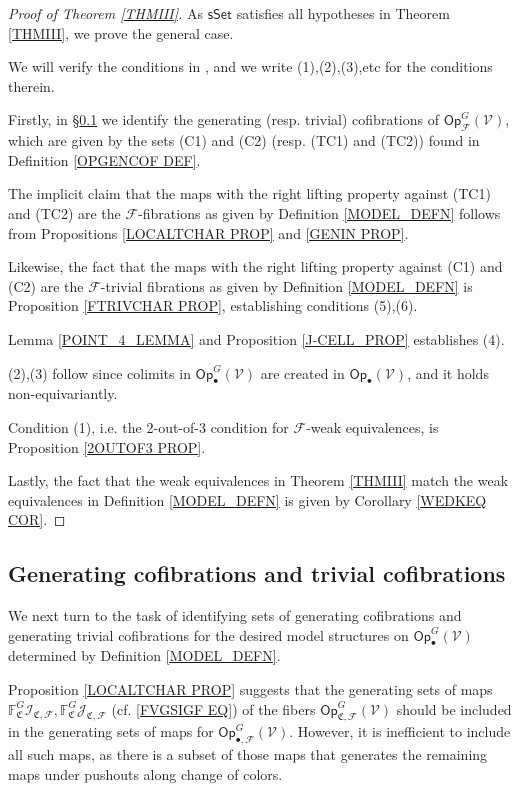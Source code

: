 \documentclass[a4paper,10pt
,draft
]{article}%
\numberwithin{equation}{section}
\numberwithin{figure}{section}
\theoremstyle{definition} %
\newcommand{\sSet}{\ensuremath{\mathsf{sSet}}}%
\newcommand{\Op}{\mathsf{Op}}%
\newcommand{\F}{\ensuremath{\mathcal F}}
\newcommand{\V}{\ensuremath{\mathcal V}}
\newcommand{\1}{\ensuremath{\mathbbm 1}}%
\begin{document}
\begin{proof}[Proof of Theorem \ref{THMIII}]
      As $\sSet$ satisfies all 
      hypotheses in Theorem \ref{THMIII}, we prove the general case.

      We will verify the conditions in 
\cite[Theorem 2.1.19]{Hov99}, and we write (1),(2),(3),etc for the conditions therein.

Firstly, in \S \ref{GENCOF SEC} we identify
the generating (resp. trivial) cofibrations of $\mathsf{Op}^G_{\F}(\V)$,
which are given by the sets 
(C1) and (C2) (resp. (TC1) and (TC2))
found in Definition \ref{OPGENCOF DEF}.

The implicit claim that the maps
with the right lifting property against 
(TC1) and (TC2)
are the $\F$-fibrations as given by 
Definition \ref{MODEL_DEFN}
follows from Propositions \ref{LOCALTCHAR PROP} and \ref{GENIN PROP}.

Likewise, the fact that the maps
with the right lifting property against 
(C1) and (C2) are the 
$\F$-trivial fibrations as given by 
Definition \ref{MODEL_DEFN}
is Proposition \ref{FTRIVCHAR PROP}, 
establishing conditions (5),(6).

Lemma \ref{POINT_4_LEMMA} and Proposition \ref{J-CELL_PROP} establishes (4).

(2),(3) follow since colimits in $\mathsf{Op}^G_\bullet(\V)$ are created in $\Op_{\bullet}(\V)$, and it holds non-equivariantly.

Condition (1), i.e. the $2$-out-of-$3$ condition for $\F$-weak equivalences, 
is Proposition \ref{2OUTOF3 PROP}.

Lastly, the fact that the weak equivalences in 
Theorem \ref{THMIII}
match the weak equivalences in
Definition \ref{MODEL_DEFN} is given by 
Corollary \ref{WEDKEQ COR}.
\end{proof}





\subsection{Generating cofibrations and trivial cofibrations}
\label{GENCOF SEC}

We next turn to the task of identifying sets of generating cofibrations and generating trivial cofibrations
for the desired model structures
on $\mathsf{Op}^G_{\bullet}(\V)$ determined by Definition \ref{MODEL_DEFN}.


Proposition \ref{LOCALTCHAR PROP} suggests that
the generating sets of maps
$\mathbb{F}^G_{\mathfrak{C}} \mathcal{I}_{\mathfrak{C},\mathcal{F}},
\mathbb{F}^G_{\mathfrak{C}} \mathcal{J}_{\mathfrak{C},\mathcal{F}}$
(cf. \eqref{FVGSIGF EQ}) of the fibers 
$\mathsf{Op}^G_{\mathfrak{C},\F}(\V)$
should be included
in the generating sets of maps for 
$\mathsf{Op}^G_{\bullet,\F}(\V)$.
However, it is inefficient to include all such maps, 
as there is a subset of those maps
that generates the remaining maps under pushouts along change of colors.
\end{document}
